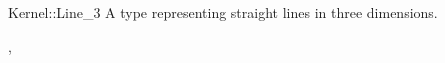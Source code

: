 \begin{ccRefConcept}{Kernel::Line_3}
A type representing straight lines in three dimensions.

\ccRefines
{},

\ccSeeAlso
{}

\end{ccRefConcept}
